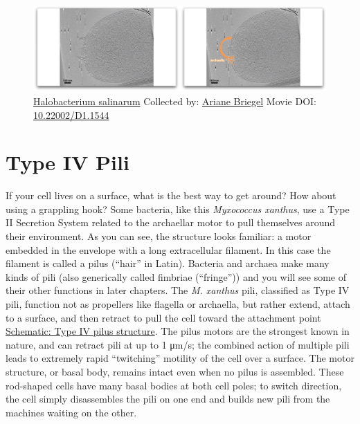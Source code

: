 \documentclass[]{tufte-book}
\begin{document}
\begin{figure}
\includegraphics{movie_stills/6_9c} \caption[\protect\hyperlink{tree}{Halobacterium salinarum} Collected
by: \protect\hyperlink{ariane_briegel}{Ariane Briegel} Movie DOI:
\href{https://doi.org/10.22002/D1.1544}{10.22002/D1.1544}]{\protect\hyperlink{tree}{Halobacterium salinarum} Collected
by: \protect\hyperlink{ariane_briegel}{Ariane Briegel} Movie DOI:
\href{https://doi.org/10.22002/D1.1544}{10.22002/D1.1544}}\label{fig:6-9c}
\end{figure}

\section{Type IV Pili}\label{type-iv-pili}

If your cell lives on a surface, what is the best way to get around? How
about using a grappling hook? Some bacteria, like this \emph{Myxococcus
xanthus}, use a Type II Secretion System related to the archaellar motor
to pull themselves around their environment. As you can see, the
structure looks familiar: a motor embedded in the envelope with a long
extracellular filament. In this case the filament is called a pilus
(``hair'' in Latin). Bacteria and archaea make many kinds of pili (also
generically called fimbriae (``fringe'')) and you will see some of their
other functions in later chapters. The \emph{M. xanthus} pili,
classified as Type IV pili, function not as propellers like flagella or
archaella, but rather extend, attach to a surface, and then retract to
pull the cell toward the attachment point
\protect\hyperlink{Type_IV_pilus_structure}{Schematic: Type IV pilus
structure}. The pilus motors are the strongest known in nature, and can
retract pili at up to 1 μm/s; the combined action of multiple pili leads
to extremely rapid ``twitching'' motility of the cell over a surface.
The motor structure, or basal body, remains intact even when no pilus is
assembled. These rod-shaped cells have many basal bodies at both cell
poles; to switch direction, the cell simply disassembles the pili on one
end and builds new pili from the machines waiting on the other.
\end{document}

